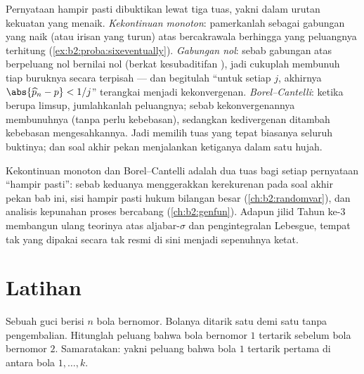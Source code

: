 \begin{remark}
Pernyataan hampir pasti dibuktikan lewat tiga tuas, yakni dalam
urutan kekuatan yang menaik. \emph{Kekontinuan monoton}:
pamerkanlah  sebagai gabungan yang naik (atau irisan
yang turun) atas  bercakrawala berhingga yang peluangnya
terhitung (\cref{ex:b2:proba:sixeventually}).
\emph{Gabungan nol}: sebab gabungan  atas  berpeluang nol
bernilai nol (berkat kesubaditifan ), jadi cukuplah
membunuh tiap  buruknya secara terpisah --- dan begitulah ``untuk setiap
$j$, akhirnya $\abs{\widehat p_n - p} < 1/j$'' terangkai
menjadi kekonvergenan. \emph{Borel--Cantelli}: ketika  berupa
limsup, jumlahkanlah peluangnya; sebab kekonvergenannya membunuhnya
(tanpa perlu kebebasan), sedangkan kedivergenan ditambah kebebasan
mengesahkannya. Jadi memilih tuas yang tepat biasanya seluruh
buktinya; dan soal akhir pekan menjalankan ketiganya dalam satu
hujah.
\end{remark}

\begin{remark}
Kekontinuan monoton dan Borel--Cantelli adalah dua tuas bagi
setiap pernyataan ``hampir pasti'': sebab keduanya menggerakkan kerekurenan
 pada soal akhir pekan bab ini,
sisi hampir pasti hukum bilangan besar
(\cref{ch:b2:randomvar}), dan analisis kepunahan
proses bercabang (\cref{ch:b2:genfun}). Adapun jilid Tahun ke-3
membangun ulang teorinya atas aljabar-$\sigma$ dan pengintegralan
Lebesgue, tempat  tak  yang dipakai
secara tak resmi di sini menjadi sepenuhnya ketat.
\end{remark}

\section{Latihan}

\begin{exercise}[$\star$]\label{exo:b2:proba:1}
Sebuah guci berisi $n$ bola bernomor. Bolanya ditarik satu demi satu
tanpa pengembalian. Hitunglah peluang bahwa bola bernomor $1$
tertarik sebelum bola bernomor $2$. Samaratakan: yakni peluang bahwa
bola $1$ tertarik pertama di antara bola $1, \dots, k$.
\end{exercise}

